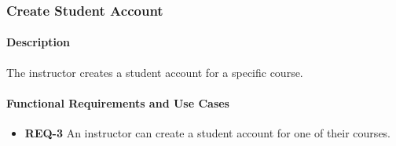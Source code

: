 \documentclass{article}
\begin{document}
\subsubsection{Create Student Account}

\paragraph{Description} The instructor creates a student account for a specific course.

\paragraph{Functional Requirements and Use Cases}
\begin{itemize}
  \item \textbf{REQ-3} An instructor can create a student account for one of their courses.
\end{itemize}

\vspace{0.1in}
\end{document}
